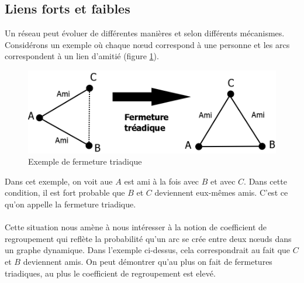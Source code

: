 \subsection{Liens forts et faibles}
Un réseau peut évoluer de différentes manières et selon différents mécanismes.
Considérons un exemple où chaque n\oe ud correspond à une personne et les arcs correspondent à un lien d'amitié (figure \ref{fermeture_triadique}).
	\begin{figure}
	\center
	\includegraphics[scale=0.5]{images/18_fermeture_triadique.png}
	\caption{\label{fermeture_triadique} Exemple de fermeture triadique}
	\end{figure}
Dans cet exemple, on voit aue $A$ est ami à la fois avec $B$ et avec $C$. Dans cette condition, il est fort probable que $B$ et $C$ deviennent eux-mêmes amis. C'est ce qu'on appelle la fermeture triadique.\\
\\
Cette situation nous amène à nous intéresser à la notion de coefficient de regroupement qui reflète la probabilité qu'un arc se crée entre deux n\oe uds dans un graphe dynamique. 
Dans l'exemple ci-dessus, cela correspondrait au fait que $C$ et $B$ deviennent amis. On peut démontrer qu'au plus on fait de fermetures triadiques, au plus le coefficient de regroupement est elevé.

